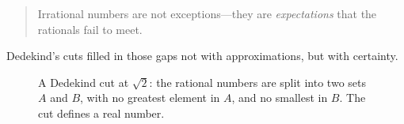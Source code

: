 \begin{quote}
Irrational numbers are not exceptions—they are \emph{expectations} that the rationals fail to meet.
\end{quote}

Dedekind’s cuts filled in those gaps not with approximations, but with certainty.


\begin{figure}[H]
    \centering
    
    \caption{A Dedekind cut at \( \sqrt{2} \): the rational numbers are split into two sets \( A \) and \( B \), with no greatest element in \( A \), and no smallest in \( B \). The cut defines a real number.}
  \end{figure}





